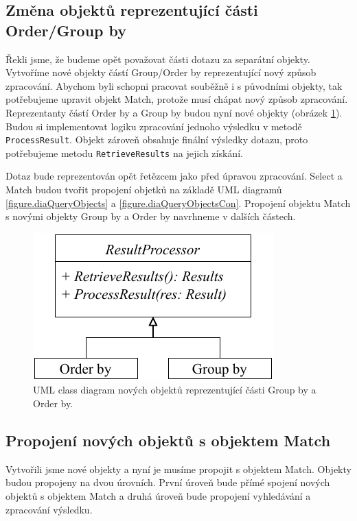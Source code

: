 \subsection{Změna objektů reprezentující části Order/Group by}

Řekli jsme, že budeme opět považovat části dotazu za separátní objekty.
Vytvoříme nové objekty částí Group/Order by reprezentující nový způsob zpracování.
Abychom byli schopni pracovat souběžně i s původními objekty, tak potřebujeme upravit objekt Match, protože musí chápat nový způsob zpracování. 
Reprezentanty částí Order by a Group by budou nyní nové objekty (obrázek \ref{figure.diaStreamedResultProcessor}).
Budou si implementovat logiku zpracování jednoho výsledku v metodě \texttt{ProcessResult}.
Objekt zároveň obsahuje finální výsledky dotazu, proto potřebujeme metodu \texttt{RetrieveResults} na jejich získání.

Dotaz bude reprezentován opět řetězcem jako před úpravou zpracování.
Select a Match budou tvořit propojení objetků na základě UML diagramů \ref{figure.diaQueryObjects} a \ref{figure.diaQueryObjectsCon}.
Propojení objektu Match s novými objekty Group by a Order by navrhneme v dalších částech.

\begin{figure}[!htp]
\includegraphics{../img/diaStreamedResultProcessor.pdf}\centering
\caption{UML class diagram nových objektů reprezentující části Group by a Order by.}
\label{figure.diaStreamedResultProcessor}
\end{figure}

\subsection{Propojení nových objektů s objektem Match}

Vytvořili jsme nové objekty a nyní je musíme propojit s objektem Match.
Objekty budou propojeny na dvou úrovních.
První úroveň bude přímé spojení nových objektů s objektem Match a druhá úroveň bude propojení vyhledávání a zpracování výsledku.

